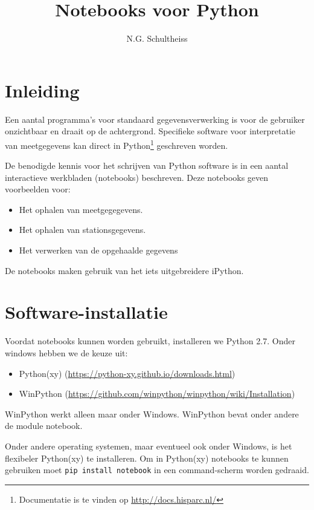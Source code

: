 

\title{Notebooks voor Python}
\author{N.G. Schultheiss}



\maketitle

\section{Inleiding}

Een aantal programma's voor standaard \hisparc gegevensverwerking is voor de gebruiker onzichtbaar
en draait op de achtergrond. Specifieke software voor interpretatie van meetgegevens kan direct in
Python\footnote{Documentatie is te vinden op \url{http://docs.hisparc.nl/}} geschreven worden.

De benodigde kennis voor het schrijven van Python software is in een aantal interactieve werkbladen
 (notebooks) beschreven. Deze notebooks geven voorbeelden voor:
\begin{itemize}
\item Het ophalen van meetgegegevens.
\item Het ophalen van stationsgegevens.
\item Het verwerken van de opgehaalde gegevens
\end{itemize}
De notebooks maken gebruik van het iets uitgebreidere iPython.

\section{Software-installatie}

Voordat notebooks kunnen worden gebruikt, installeren we Python 2.7. Onder windows hebben we de keuze uit:
\begin{itemize}
\item Python(xy) (\url{https://python-xy.github.io/downloads.html})
\item WinPython (\url{https://github.com/winpython/winpython/wiki/Installation})
\end{itemize}

WinPython werkt alleen maar onder Windows. WinPython bevat onder andere de module notebook.

Onder andere operating systemen, maar eventueel ook onder Windows, is het flexibeler Python(xy) te installeren.
Om in Python(xy) notebooks te kunnen gebruiken moet {\tt pip install notebook} in een command-scherm worden
gedraaid.

